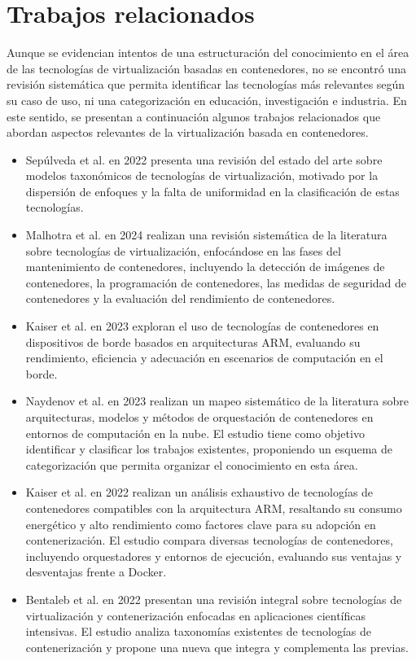 \section{Trabajos relacionados}\label{sec:trabajos-relacionados}
Aunque se evidencian intentos de una estructuración del conocimiento en el área de las tecnologías de virtualización basadas en contenedores, no se encontró una revisión sistemática que permita identificar las tecnologías más relevantes según su caso de uso, ni una categorización en educación, investigación e industria. En este sentido, se presentan a continuación algunos trabajos relacionados que abordan aspectos relevantes de la virtualización basada en contenedores.

\begin{itemize}
    \item[\textendash] Sepúlveda et al. en 2022 \cite{SepulvedaRodriguez2022} presenta una revisión del estado del arte sobre modelos taxonómicos de tecnologías de virtualización, motivado por la dispersión de enfoques y la falta de uniformidad en la clasificación de estas tecnologías.
    \item[\textendash] Malhotra et al. en 2024 \cite{Malhotra2024} realizan una revisión sistemática de la literatura sobre tecnologías de virtualización, enfocándose en las fases del mantenimiento de contenedores, incluyendo la detección de imágenes de contenedores, la programación de contenedores, las medidas de seguridad de contenedores y la evaluación del rendimiento de contenedores.
    \item[\textendash] Kaiser et al. en 2023 \cite{Kaiser2023}  exploran el uso de tecnologías de contenedores en dispositivos de borde basados en arquitecturas ARM, evaluando su rendimiento, eficiencia y adecuación en escenarios de computación en el borde.
    \item[\textendash] Naydenov et al. en 2023 \cite{10094059}  realizan un mapeo sistemático de la literatura sobre arquitecturas, modelos y métodos de orquestación de contenedores en entornos de computación en la nube. El estudio tiene como objetivo identificar y clasificar los trabajos existentes, proponiendo un esquema de categorización que permita organizar el conocimiento en esta área.
    \item[\textendash] Kaiser et al. en 2022 \cite{Kaiser2022} realizan un análisis exhaustivo de tecnologías de contenedores compatibles con la arquitectura ARM, resaltando su consumo energético y alto rendimiento como factores clave para su adopción en contenerización. El estudio compara diversas tecnologías de contenedores, incluyendo orquestadores y entornos de ejecución, evaluando sus ventajas y desventajas frente a Docker.
    \item[\textendash] Bentaleb et al. en 2022 \cite{Bentaleb2022} presentan una revisión integral sobre tecnologías de virtualización y contenerización enfocadas en aplicaciones científicas intensivas. El estudio analiza taxonomías existentes de tecnologías de contenerización y propone una nueva que integra y complementa las previas.
\end{itemize}